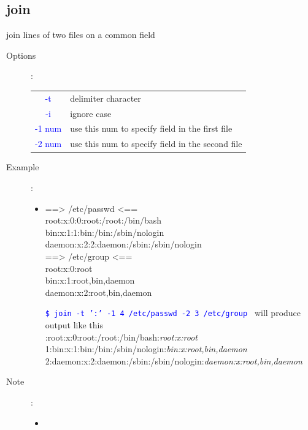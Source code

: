 \documentclass[a4paper,12pt,twoside]{book}
\newcommand{\linuxcommand}[1]{\texttt{\textcolor{blue}{\$ #1 \Pisymbol{psy}{191}}}}
\newcommand{\op}[1]{\textcolor{blue}{-#1}}
\newenvironment{screen}{\sffamily}{\rmfamily}
\begin{document}
\begin{CJK*}{UTF8}{song}
\section{join}
	join lines of two files on a common field
	\begin{description}
	\item[Options]: \\
		\begin{tabular}{c|p{}}
		\hline
		\op{t} & delimiter character \\
		\op{i} & ignore case \\
		\op{1 num} & use this num to specify field in the first file \\
		\op{2 num} & use this num to specify field in the second file \\
		\hline
		\end{tabular}		
	\item[Example]:
		\begin{itemize}
		\item
		\begin{screen}
		==> /etc/passwd <==  \\
		root:x:0:0:root:/root:/bin/bash \\
		bin:x:1:1:bin:/bin:/sbin/nologin \\
		daemon:x:2:2:daemon:/sbin:/sbin/nologin \\

		==> /etc/group <== \\
		root:x:0:root \\
		bin:x:1:root,bin,daemon \\
		daemon:x:2:root,bin,daemon \\
		\end{screen}
		
		\linuxcommand{join -t ':' -1 4 /etc/passwd -2 3 /etc/group}
		will produce output like this \\

		\begin{screen}
		0:root:x:0:root:/root:/bin/bash:\textit{root:x:root} \\
		 1:bin:x:1:bin:/bin:/sbin/nologin:\textit{bin:x:root,bin,daemon} \\
		 2:daemon:x:2:daemon:/sbin:/sbin/nologin:\textit{daemon:x:root,bin,daemon} \\
		\end{screen}
		\end{itemize}
	\item[Note]:
		\begin{itemize}
		\item
		\end{itemize}
	\end{description}

\end{CJK*}
\end{document}
